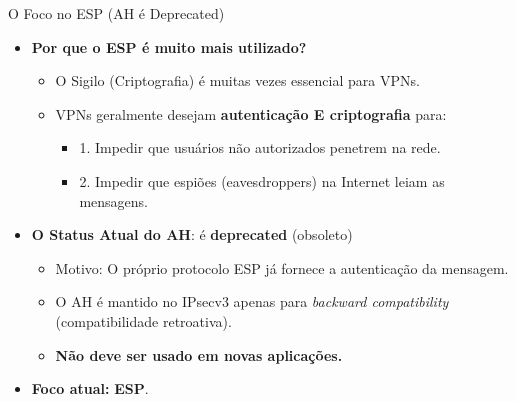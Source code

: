 \begin{frame}{O Foco no ESP (AH é Deprecated)}
    \begin{itemize}
        \item \textbf{Por que o ESP é muito mais utilizado?}
              \begin{itemize}
                  \item O Sigilo (Criptografia) é muitas vezes essencial para VPNs.
                  \item VPNs geralmente desejam \textbf{autenticação E criptografia} para:
                        \begin{itemize}
                            \item 1. Impedir que usuários não autorizados penetrem na rede.
                            \item 2. Impedir que espiões (eavesdroppers) na Internet leiam as mensagens.
                        \end{itemize}
              \end{itemize}

        \item \textbf{O Status Atual do AH}: é \textbf{deprecated} (obsoleto)
              \begin{itemize}

                  \item Motivo: O próprio protocolo ESP já fornece a autenticação da mensagem.
                  \item O AH é mantido no IPsecv3 apenas para \textit{backward compatibility} (compatibilidade retroativa).
                  \item \textbf{Não deve ser usado em novas aplicações.}
              \end{itemize}

        \item \textbf{Foco atual:} \textbf{ESP}.

    \end{itemize}
\end{frame}

